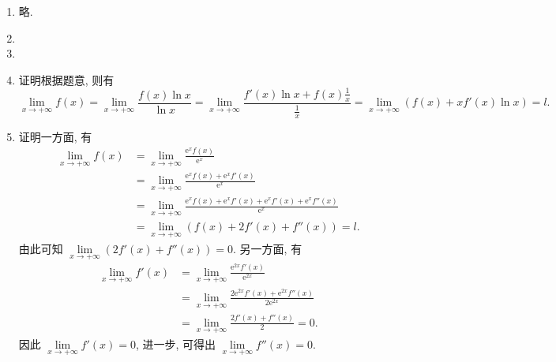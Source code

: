 \documentclass[a4paper, 10pt]{ctexart}
\begin{document}
\pagestyle{empty}
\begin{enumerate}
    \item %
        略.
    \item %
    \item %
    \item %
        {\heiti 证明}\quad 根据题意, 则有
        \[
            \lim_{x\to+\infty}f(x) = \lim_{x\to+\infty}\frac{f(x)\ln x}{\ln x} = \lim_{x\to+\infty}\frac{f'(x)\ln x + f(x)\frac1x}{\frac1x} = \lim_{x\to+\infty}(f(x) + xf'(x)\ln x) = l.    
        \]
    \item %
        {\heiti 证明}\quad 一方面, 有
        \begin{align*}
            \lim_{x\to+\infty}f(x) &= \lim_{x\to+\infty}\frac{\mathrm{e}^xf(x)}{\mathrm{e}^x} \\
                                   &= \lim_{x\to+\infty}\frac{\mathrm{e}^xf(x) + \mathrm{e}^xf'(x)}{\mathrm{e}^x} \\
                                   &= \lim_{x\to+\infty}\frac{\mathrm{e}^xf(x) + \mathrm{e}^xf'(x) + \mathrm{e}^xf'(x) + \mathrm{e}^xf''(x)}{\mathrm{e}^x} \\
                                   &= \lim_{x\to+\infty}(f(x) + 2f'(x) + f''(x)) = l.
        \end{align*}
        由此可知 $\lim\limits_{x\to+\infty}(2f'(x) + f''(x)) = 0$. 另一方面, 有
        \begin{align*}
            \lim_{x\to+\infty}f'(x) &= \lim_{x\to+\infty}\frac{\mathrm{e}^{2x}f'(x)}{\mathrm{e}^{2x}} \\
                                    &= \lim_{x\to+\infty}\frac{2\mathrm{e}^{2x}f'(x) + \mathrm{e}^{2x}f''(x)}{2\mathrm{e}^{2x}} \\
                                    &= \lim_{x\to+\infty}\frac{2f'(x) + f''(x)}{2} = 0.
        \end{align*}
        因此 $\lim\limits_{x\to+\infty}f'(x) = 0$, 进一步, 可得出 $\lim\limits_{x\to+\infty}f''(x) = 0$.
\end{enumerate}
\end{document}
